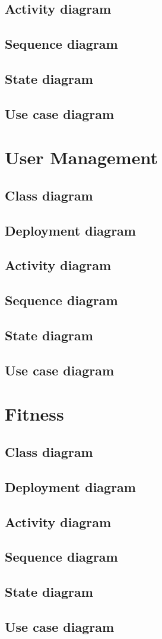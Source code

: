 \documentclass{article}
\begin{document}
		\subsection{Activity diagram}
		\subsection{Sequence diagram}
		\subsection{State diagram}
		\subsection{Use case diagram}


	\clearpage
	\section{User Management}
		\subsection{Class diagram}
		\subsection{Deployment diagram}
		\subsection{Activity diagram}
		\subsection{Sequence diagram}
		\subsection{State diagram}
		\subsection{Use case diagram}


	\clearpage
	\section{Fitness}
		\subsection{Class diagram}
		\subsection{Deployment diagram}
		\subsection{Activity diagram}
		\subsection{Sequence diagram}
		\subsection{State diagram}
		\subsection{Use case diagram}
\end{document}

